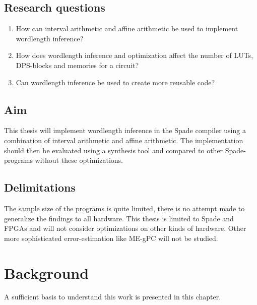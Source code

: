 \documentclass[msc,lith,english]{liuthesis}
\begin{document}
\section{Research questions}
\begin{enumerate}
  \item How can interval arithmetic and affine arithmetic be used to implement wordlength inference?
  \item How does wordlength inference and optimization affect the number of LUTs, DPS-blocks and memories for a circuit?
  \item Can wordlength inference be used to create more reusable code?
\end{enumerate}

\section{Aim}
This thesis will implement wordlength inference in the Spade compiler using a combination of interval arithmetic and affine arithmetic. The implementation should then be evaluated using a synthesis tool and compared to other Spade-programs without these optimizations.

\section{Delimitations}
The sample size of the programs is quite limited, there is no attempt made to generalize the findings to all hardware. This thesis is limited to Spade and FPGAs and will not consider optimizations on other kinds of hardware. Other more sophisticated error-estimation like ME-gPC will not be studied.

\chapter{Background}
\label{chaBackground}
A sufficient basis to understand this work is presented in this chapter.

% 
\end{document}

